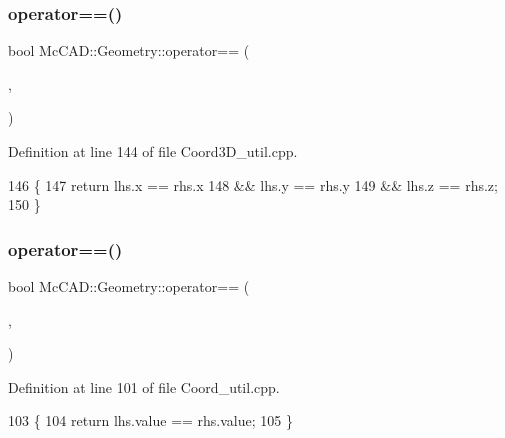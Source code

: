 \subsubsection{\texorpdfstring{operator==()}{operator==()}\hspace{0.1cm}{\footnotesize\ttfamily [2/3]}}
{\footnotesize\ttfamily bool Mc\+C\+A\+D\+::\+Geometry\+::operator== (\begin{DoxyParamCaption}\item[{const \hyperlink{classMcCAD_1_1Geometry_1_1Coord3D}{Coord3D} \&}]{,  }\item[{const \hyperlink{classMcCAD_1_1Geometry_1_1Coord3D}{Coord3D} \&}]{ }\end{DoxyParamCaption})}



Definition at line 144 of file Coord3\+D\+\_\+util.\+cpp.


\begin{DoxyCode}
146                            \{
147     \textcolor{keywordflow}{return} lhs.x == rhs.x
148             && lhs.y == rhs.y
149             && lhs.z == rhs.z;
150 \}
\end{DoxyCode}
\mbox{\label{namespaceMcCAD_1_1Geometry_a3985665b80ce51ad272be8c327c2b57e}} 
\subsubsection{\texorpdfstring{operator==()}{operator==()}\hspace{0.1cm}{\footnotesize\ttfamily [3/3]}}
{\footnotesize\ttfamily bool Mc\+C\+A\+D\+::\+Geometry\+::operator== (\begin{DoxyParamCaption}\item[{const \hyperlink{classMcCAD_1_1Geometry_1_1Coord}{Coord} \&}]{,  }\item[{const \hyperlink{classMcCAD_1_1Geometry_1_1Coord}{Coord} \&}]{ }\end{DoxyParamCaption})}



Definition at line 101 of file Coord\+\_\+util.\+cpp.


\begin{DoxyCode}
103                          \{
104     \textcolor{keywordflow}{return} lhs.value == rhs.value;
105 \}
\end{DoxyCode}
\mbox{\label{namespaceMcCAD_1_1Geometry_a69cd9edcab158c93bf2ae221941c8654}} 
